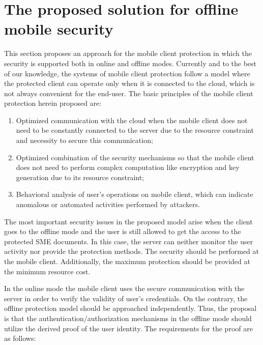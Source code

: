 \documentclass[twocolumn]{svjour3}          	%
\begin{document}
\section{The proposed solution for offline mobile security}
\label{sec_offline_mode}
This section proposes an approach for the mobile client protection in which the security is supported both in online and offline modes. Currently and to the best of our knowledge, the systems of mobile client protection follow a model where the protected client can operate only when it is connected to the cloud, which is not always convenient for the end-user. The basic principles of the mobile client protection herein proposed are: 

\begin{enumerate}
	\item Optimized communication with the cloud when the mobile client does not need to be constantly connected to the server due to the resource constraint and necessity to secure this communication;
	\item Optimized combination of the security mechanisms so that the mobile client does not need to perform complex computation like encryption and key generation due to its resource constraint;
	\item Behavioral analysis of user's operations on mobile client, which can indicate anomalous or automated activities performed by attackers.
\end{enumerate}

The most important security issues in the proposed model arise when the client goes to the offline mode and the user is still allowed to get the access to the protected SME documents. In this case, the server can neither monitor the user activity nor provide the protection methods. The security should be performed at the mobile client. Additionally, the maximum protection should be provided at the minimum resource cost. 

In the online mode the mobile client uses the secure communication with the server in order to verify the validity of user’s credentials. On the contrary, the offline protection model should be approached independently. Thus, the proposal is that the authentication/authorization mechanisms in the offline mode should utilize the derived proof of the user identity. The requirements for the proof are as follows:
\end{document}
